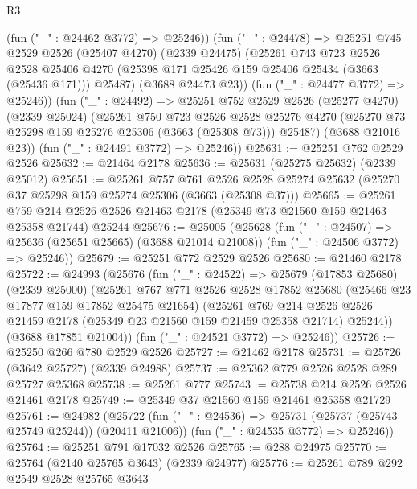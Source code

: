 \begin{lexlean}{R3}
\begin{coremodule}
          (fun ("_" : @24462 @3772) => @25246))
        (fun ("_" : @24478) =>
        @25251
          @745
          @2529
          @2526
          (@25407 @4270)
          (@2339 @24475)
          (@25261
            @743
            @723
            @2526
            @2528
            @25406
            @4270
            (@25398 @171 @25426 @159 @25406 @25434 (@3663 (@25436 @171)))
            @25487)
          (@3688 @24473 @23))
        (fun ("_" : @24477 @3772) => @25246))
      (fun ("_" : @24492) =>
      @25251
        @752
        @2529
        @2526
        (@25277 @4270)
        (@2339 @25024)
        (@25261
          @750
          @723
          @2526
          @2528
          @25276
          @4270
          (@25270 @73 @25298 @159 @25276 @25306 (@3663 (@25308 @73)))
          @25487)
        (@3688 @21016 @23))
      (fun ("_" : @24491 @3772) => @25246))
@25631 := @25251 @762 @2529 @2526
@25632 := @21464 @2178
@25636 := @25631 (@25275 @25632) (@2339 @25012)
@25651 := @25261
    @757
    @761
    @2526
    @2528
    @25274
    @25632
    (@25270 @37 @25298 @159 @25274 @25306 (@3663 (@25308 @37)))
@25665 := @25261
    @759
    @214
    @2526
    @2526
    @21463
    @2178
    (@25349 @73 @21560 @159 @21463 @25358 @21744)
    @25244
@25676 := @25005
    (@25628
      (fun ("_" : @24507) => @25636 (@25651 @25665) (@3688 @21014 @21008))
      (fun ("_" : @24506 @3772) => @25246))
@25679 := @25251 @772 @2529 @2526
@25680 := @21460 @2178
@25722 := @24993
    (@25676
      (fun ("_" : @24522) =>
      @25679
        (@17853 @25680)
        (@2339 @25000)
        (@25261
          @767
          @771
          @2526
          @2528
          @17852
          @25680
          (@25466 @23 @17877 @159 @17852 @25475 @21654)
          (@25261
            @769
            @214
            @2526
            @2526
            @21459
            @2178
            (@25349 @23 @21560 @159 @21459 @25358 @21714)
            @25244))
        (@3688 @17851 @21004))
      (fun ("_" : @24521 @3772) => @25246))
@25726 := @25250 @266 @780 @2529 @2526
@25727 := @21462 @2178
@25731 := @25726 (@3642 @25727) (@2339 @24988)
@25737 := @25362 @779 @2526 @2528 @289 @25727 @25368
@25738 := @25261 @777
@25743 := @25738 @214 @2526 @2526 @21461 @2178
@25749 := @25349 @37 @21560 @159 @21461 @25358 @21729
@25761 := @24982
    (@25722
      (fun ("_" : @24536) => @25731 (@25737 (@25743 @25749 @25244)) (@20411 @21006))
      (fun ("_" : @24535 @3772) => @25246))
@25764 := @25251 @791 @17032 @2526
@25765 := @288 @24975
@25770 := @25764 (@2140 @25765 @3643) (@2339 @24977)
@25776 := @25261 @789 @292 @2549 @2528 @25765 @3643

\end{coremodule}
\end{lexlean}
